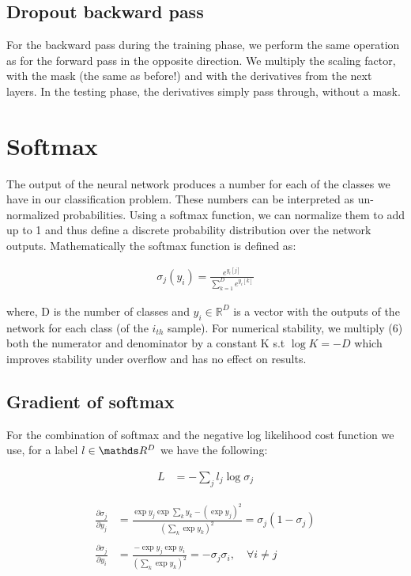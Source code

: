 \documentclass[12pt,twoside]{article}
\begin{document}
\subsection{Dropout backward pass}

For the backward pass during the training phase, we perform the same operation as for the forward pass in the opposite direction. We multiply the scaling factor, with the mask (the same as before!) and with the derivatives from the next layers. In the testing phase, the derivatives simply pass through, without a mask. 


\section{Softmax}

The output of the neural network produces a number for each of the classes we have in our classification problem. These numbers can be interpreted as un-normalized probabilities. Using a softmax function, we can normalize them to add up to 1 and thus define a discrete probability distribution over the network outputs. Mathematically the softmax function is defined as:

\begin{align}
\sigma_j (y_i) = \frac{e^{y_i[j]}}{\sum_{k=1}^{D} e^{y_i[k]}}
\end{align}

where, D is the number of classes and $y_i \in \mathbb{R}^D$ is a vector with the outputs of the network for each class (of the $i_{th}$ sample). For numerical stability, we multiply (6) both the numerator and denominator by a constant K s.t $\log K = -D$ which improves stability under overflow and has no effect on results.



\subsection{Gradient of softmax}
For the combination of softmax and the negative log likelihood cost function we use, for a label $l \in \R^{D}$ we have the following:

\begin{align*}
L &= - \sum_j l_j \log \sigma_j
\end{align*}

\begin{align*}
\frac{\partial \sigma_j}{\partial y_j} &= \frac{\exp y_j \exp \sum_k y_k - (\exp y_j)^2}{(\sum_k \exp y_k)^2}= \sigma_j (1 - \sigma_j)\\
\\
\frac{\partial \sigma_j}{\partial y_i} &= \frac{-\exp y_j \exp y_i}{(\sum_k \exp y_k)^2}= -\sigma_j \sigma_i, \quad \forall i \neq j
\end{align*}
\end{document}
